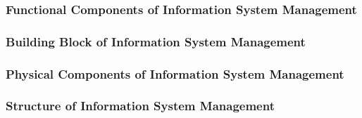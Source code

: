 \documentclass[12pt,titlepage]{article}
\begin{document}
\subsubsection{Functional Components of Information System Management}
\subsubsection{Building Block of Information System Management}
\subsubsection{Physical Components of Information System Management}
\subsubsection{Structure of Information System Management}
\end{document}
